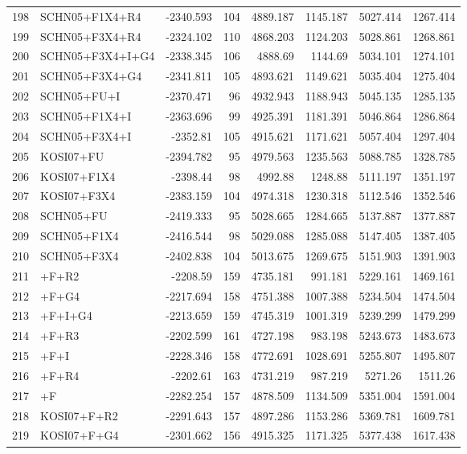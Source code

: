 \documentclass[12pt]{article}
\begin{document}
\begin{longtable}{clrrrrrr}
	198 & SCHN05+F1X4+R4 & -2340.593 & 104 & 4889.187 & 1145.187 & 5027.414 & 1267.414 \\ 
	199 & SCHN05+F3X4+R4 & -2324.102 & 110 & 4868.203 & 1124.203 & 5028.861 & 1268.861 \\ 
	200 & SCHN05+F3X4+I+G4 & -2338.345 & 106 & 4888.69 & 1144.69 & 5034.101 & 1274.101 \\ 
	201 & SCHN05+F3X4+G4 & -2341.811 & 105 & 4893.621 & 1149.621 & 5035.404 & 1275.404 \\ 
	202 & SCHN05+FU+I & -2370.471 & 96 & 4932.943 & 1188.943 & 5045.135 & 1285.135 \\ 
	203 & SCHN05+F1X4+I & -2363.696 & 99 & 4925.391 & 1181.391 & 5046.864 & 1286.864 \\ 
	204 & SCHN05+F3X4+I & -2352.81 & 105 & 4915.621 & 1171.621 & 5057.404 & 1297.404 \\ 
	205 & KOSI07+FU & -2394.782 & 95 & 4979.563 & 1235.563 & 5088.785 & 1328.785 \\ 
	206 & KOSI07+F1X4 & -2398.44 & 98 & 4992.88 & 1248.88 & 5111.197 & 1351.197 \\ 
	207 & KOSI07+F3X4 & -2383.159 & 104 & 4974.318 & 1230.318 & 5112.546 & 1352.546 \\ 
	208 & SCHN05+FU & -2419.333 & 95 & 5028.665 & 1284.665 & 5137.887 & 1377.887 \\ 
	209 & SCHN05+F1X4 & -2416.544 & 98 & 5029.088 & 1285.088 & 5147.405 & 1387.405 \\ 
	210 & SCHN05+F3X4 & -2402.838 & 104 & 5013.675 & 1269.675 & 5151.903 & 1391.903 \\ 
	211 & \gy+F+R2 & -2208.59 & 159 & 4735.181 & 991.181 & 5229.161 & 1469.161 \\ 
	212 & \gy+F+G4 & -2217.694 & 158 & 4751.388 & 1007.388 & 5234.504 & 1474.504 \\ 
	213 & \gy+F+I+G4 & -2213.659 & 159 & 4745.319 & 1001.319 & 5239.299 & 1479.299 \\ 
	214 & \gy+F+R3 & -2202.599 & 161 & 4727.198 & 983.198 & 5243.673 & 1483.673 \\ 
	215 & \gy+F+I & -2228.346 & 158 & 4772.691 & 1028.691 & 5255.807 & 1495.807 \\ 
	216 & \gy+F+R4 & -2202.61 & 163 & 4731.219 & 987.219 & 5271.26 & 1511.26 \\ 
	217 & \gy+F & -2282.254 & 157 & 4878.509 & 1134.509 & 5351.004 & 1591.004 \\ 
	218 & KOSI07+F+R2 & -2291.643 & 157 & 4897.286 & 1153.286 & 5369.781 & 1609.781 \\ 
	219 & KOSI07+F+G4 & -2301.662 & 156 & 4915.325 & 1171.325 & 5377.438 & 1617.438 \\ 

\end{longtable}
\end{document}
